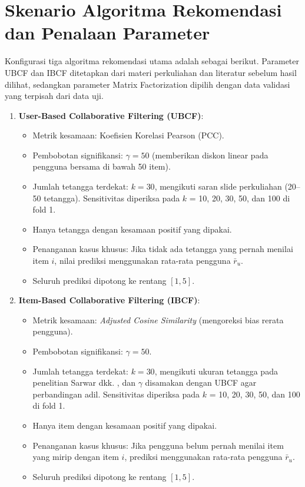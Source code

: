 \section{Skenario Algoritma Rekomendasi dan Penalaan Parameter}
Konfigurasi tiga algoritma rekomendasi utama adalah sebagai berikut. Parameter UBCF dan IBCF ditetapkan dari materi perkuliahan dan literatur sebelum hasil dilihat, sedangkan parameter Matrix Factorization dipilih dengan data validasi yang terpisah dari data uji.
\begin{enumerate}
    \item \textbf{User-Based Collaborative Filtering (UBCF)}:
    \begin{itemize}
        \item Metrik kesamaan: Koefisien Korelasi Pearson (PCC).
        \item Pembobotan signifikansi: $\gamma = 50$ (memberikan diskon linear pada pengguna bersama di bawah 50 item).
        \item Jumlah tetangga terdekat: $k = 30$, mengikuti saran slide perkuliahan (20--50 tetangga). Sensitivitas diperiksa pada $k$ = 10, 20, 30, 50, dan 100 di fold 1.
        \item Hanya tetangga dengan kesamaan positif yang dipakai.
        \item Penanganan kasus khusus: Jika tidak ada tetangga yang pernah menilai item $i$, nilai prediksi menggunakan rata-rata pengguna $\bar{r}_u$.
        \item Seluruh prediksi dipotong ke rentang $[1, 5]$.
    \end{itemize}
    
    \item \textbf{Item-Based Collaborative Filtering (IBCF)}:
    \begin{itemize}
        \item Metrik kesamaan: \textit{Adjusted Cosine Similarity} (mengoreksi bias rerata pengguna).
        \item Pembobotan signifikansi: $\gamma = 50$.
        \item Jumlah tetangga terdekat: $k = 30$, mengikuti ukuran tetangga pada penelitian Sarwar dkk. \citep{sarwar2001item}, dan $\gamma$ disamakan dengan UBCF agar perbandingan adil. Sensitivitas diperiksa pada $k$ = 10, 20, 30, 50, dan 100 di fold 1.
        \item Hanya item dengan kesamaan positif yang dipakai.
        \item Penanganan kasus khusus: Jika pengguna belum pernah menilai item yang mirip dengan item $i$, prediksi menggunakan rata-rata pengguna $\bar{r}_u$.
        \item Seluruh prediksi dipotong ke rentang $[1, 5]$.
    \end{itemize}
    

\end{enumerate}
